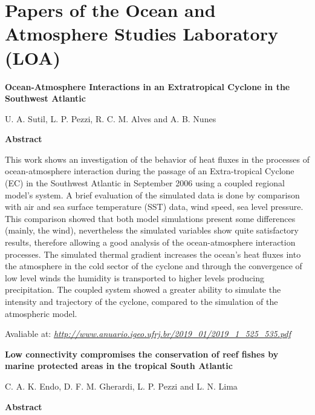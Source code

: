 \chapter{\large{Papers of the Ocean and Atmosphere Studies Laboratory (LOA)}}
\bigskip


 \begin{center}
\textbf{Ocean-Atmosphere Interactions in an Extratropical Cyclone in the Southwest Atlantic}
\bigskip

 U. A. Sutil, L. P. Pezzi, R. C. M. Alves and A. B. Nunes
\bigskip

 \textbf{Abstract}\end{center}
\bigskip

 This work shows an investigation of the behavior of heat fluxes in the processes of ocean-atmosphere interaction
during the passage of an Extra-tropical Cyclone (EC) in the Southwest Atlantic in September 2006 using a coupled
regional model’s system. A brief evaluation of the simulated data is done by comparison with air and sea surface temperature (SST) data, wind speed, sea level pressure. This comparison showed that both model simulations present some
differences (mainly, the wind), nevertheless the simulated variables show quite satisfactory results, therefore allowing a
good analysis of the ocean-atmosphere interaction processes. The simulated thermal gradient increases the ocean’s heat
fluxes into the atmosphere in the cold sector of the cyclone and through the convergence of low level winds the humidity
is transported to higher levels producing precipitation. The coupled system showed a greater ability to simulate the intensity and trajectory of the cyclone, compared to the simulation of the atmospheric model.
\bigskip

 \textcolor{black}{}
\bigskip

 Avaliable at: \textcolor{bleu_cite}{\href{http://www.anuario.igeo.ufrj.br/2019\_01/2019\_1\_525\_535.pdf}{\textit{http://www.anuario.igeo.ufrj.br/2019\_01/2019\_1\_525\_535.pdf}}}
\bigskip

\newpage
 \begin{center}
\textbf{Low connectivity compromises the conservation of reef fishes by marine protected areas in the tropical South Atlantic}
\bigskip

 C. A. K. Endo, D. F. M. Gherardi, L. P. Pezzi and L. N. Lima
\bigskip

 \textbf{Abstract}\end{center}
\bigskip


